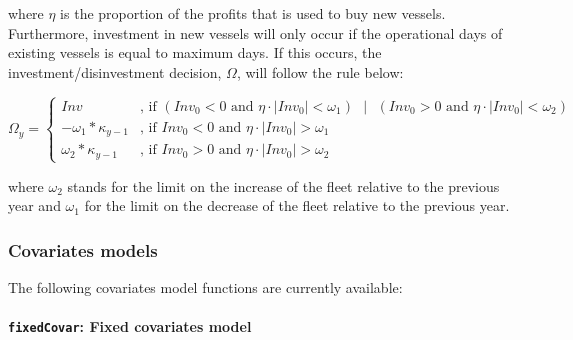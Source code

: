 \noindent where $\eta$ is the proportion of the profits that is used to buy new vessels. Furthermore, investment in new vessels 
will only occur if the operational days of existing vessels is equal to maximum days. If this occurs,
the investment/disinvestment decision, $\Omega$, will follow the rule below:


\begin{equation}
	\Omega_y = 
	\begin{cases}
		Inv			       & \text{, if } (Inv_0 < 0 \text{ and } \eta\cdot |Inv_0| < \omega_1) \text{ } | 
		                     \text{ } (Inv_0 > 0 \text{ and } \eta\cdot |Inv_0| < \omega_2)\\
		-\omega_1*\kappa_{y-1} & \text{, if } Inv_0 < 0 \text{ and } \eta\cdot |Inv_0| > \omega_1\\
		\omega_2*\kappa_{y-1} & \text{, if } Inv_0 > 0 \text{ and } \eta\cdot |Inv_0| > \omega_2
	\end{cases}
\end{equation}

\noindent where $\omega_2$ stands for the limit on the increase of the fleet relative to the previous year and 
$\omega_1$ for the limit on the decrease of the fleet relative to the previous year.\\




\subsubsection{Covariates models}

The following covariates model functions are currently available:

\paragraph{\texttt{fixedCovar}: Fixed covariates model} \hspace{0pt} \smallskip


